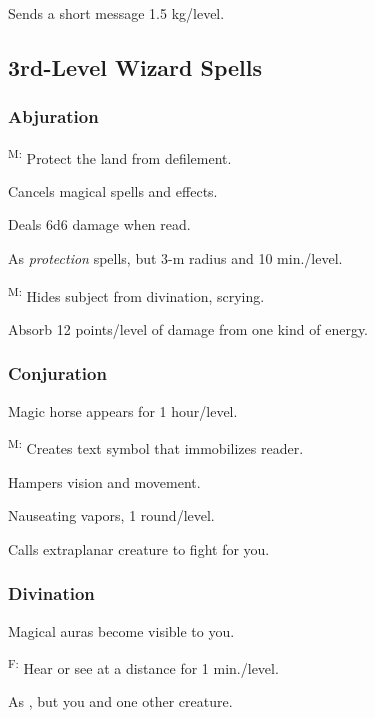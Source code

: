 	 Sends a short message 1.5 kg/level.



\subsection{3rd-Level Wizard Spells}

\subsubsection{Abjuration}
	\textsuperscript{M:} Protect the land from defilement. %

	 Cancels magical spells and effects.

	 Deals 6d6 damage when read.

	 As \emph{protection} spells, but 3-m radius and 10 min./level.

	\textsuperscript{M:} Hides subject from divination, scrying.

	 Absorb 12 points/level of damage from one kind of energy.

\subsubsection{Conjuration}
	 Magic horse appears for 1 hour/level.

	\textsuperscript{M:} Creates text symbol that immobilizes reader.

	 Hampers vision and movement.

	 Nauseating vapors, 1 round/level.

	 Calls extraplanar creature to fight for you.

\subsubsection{Divination}
	 Magical auras become visible to you.

	\textsuperscript{F:} Hear or see at a distance for 1 min./level.

	 As , but you and one other creature.

